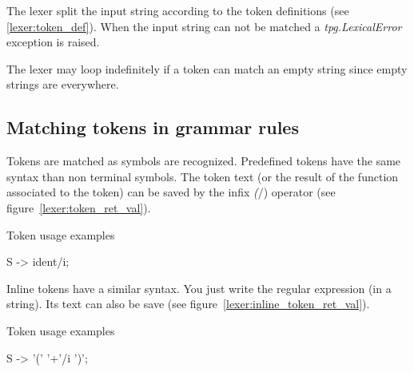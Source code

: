The lexer split the input string according to the token definitions (see \ref{lexer:token_def}). When the input string can not be matched a \emph{tpg.LexicalError} exception is raised.

The lexer may loop indefinitely if a token can match an empty string since empty strings are everywhere.

\subsection{Matching tokens in grammar rules}

Tokens are matched as symbols are recognized.
Predefined tokens have the same syntax than non terminal symbols.
The token text (or the result of the function associated to the token) can be saved by the infix \emph(/) operator (see figure~\ref{lexer:token_ret_val}).

\begin{code}
\caption{Token usage examples} \label{lexer:token_ret_val}
\begin{verbatimtab}[4]
	S -> ident/i;
\end{verbatimtab}
\end{code}

Inline tokens have a similar syntax. You just write the regular expression (in a string). Its text can also be save (see figure~\ref{lexer:inline_token_ret_val}).

\begin{code}
\caption{Token usage examples} \label{lexer:inline_token_ret_val}
\begin{verbatimtab}[4]
	S -> '(' '\w+'/i ')';
\end{verbatimtab}
\end{code}
